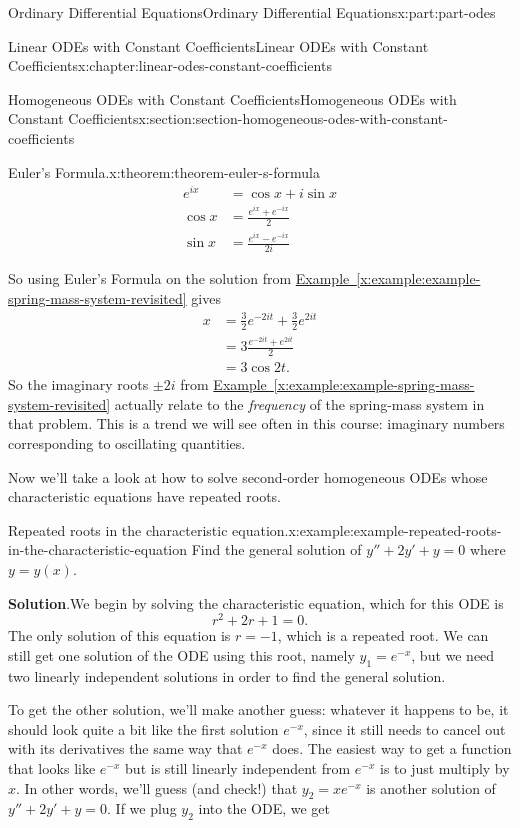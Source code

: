 \documentclass[twoside,10pt,]{book}
\newcommand{\blocktitlefont}{\relax}
\newcommand{\xreffont}{\relax}
\numberwithin{equation}{part}
\newcommand{\amp}{&}
\begin{document}
\begin{partptx}{Ordinary Differential Equations}{}{Ordinary Differential Equations}{}{}{x:part:part-odes}
\begin{chapterptx}{Linear ODEs with Constant Coefficients}{}{Linear ODEs with Constant Coefficients}{}{}{x:chapter:linear-odes-constant-coefficients}
\begin{sectionptx}{Homogeneous ODEs with Constant Coefficients}{}{Homogeneous ODEs with Constant Coefficients}{}{}{x:section:section-homogeneous-odes-with-constant-coefficients}
\begin{theorem}{Euler's Formula.}{}{x:theorem:theorem-euler-s-formula}
\begin{align*}
e^{ix} \amp = \cos x + i\sin x \\
\cos x \amp = \frac{e^{ix}+e^{-ix}}{2} \\
\sin x \amp = \frac{e^{ix} - e^{-ix}}{2i} 
\end{align*}
%
\end{theorem}
So using Euler's Formula on the solution from \hyperref[x:example:example-spring-mass-system-revisited]{Example~{\xreffont\ref{x:example:example-spring-mass-system-revisited}}} gives%
\begin{align*}
x \amp = \frac{3}{2}e^{-2it} + \frac{3}{2} e^{2it} \\
\amp = 3\frac{e^{-2it} + e^{2it}}{2} \\
\amp = 3\cos2t. 
\end{align*}
So the imaginary roots \(\pm2i\) from \hyperref[x:example:example-spring-mass-system-revisited]{Example~{\xreffont\ref{x:example:example-spring-mass-system-revisited}}} actually relate to the \emph{frequency} of the spring-mass system in that problem. This is a trend we will see often in this course: imaginary numbers corresponding to oscillating quantities.%
\par
Now we'll take a look at how to solve second-order homogeneous ODEs whose characteristic equations have repeated roots.%
\begin{example}{Repeated roots in the characteristic equation.}{x:example:example-repeated-roots-in-the-characteristic-equation}%
Find the general solution of \(y'' + 2y' + y = 0\) where \(y = y(x)\).%
\par\smallskip%
\noindent\textbf{\blocktitlefont Solution}.\hypertarget{g:solution:idp105548815517856}{}\quad{}We begin by solving the characteristic equation, which for this ODE is%
\begin{equation*}
r^{2} + 2r + 1 = 0.
\end{equation*}
The only solution of this equation is \(r=-1\), which is a repeated root. We can still get one solution of the ODE using this root, namely \(y_{1} = e^{-x}\), but we need two linearly independent solutions in order to find the general solution.%
\par
To get the other solution, we'll make another guess: whatever it happens to be, it should look quite a bit like the first solution \(e^{-x}\), since it still needs to cancel out with its derivatives the same way that \(e^{-x}\) does. The easiest way to get a function that looks like \(e^{-x}\) but is still linearly independent from \(e^{-x}\) is to just multiply by \(x\). In other words, we'll guess (and check!) that \(y_{2} = xe^{-x}\) is another solution of \(y''+2y'+y = 0\). If we plug \(y_{2}\) into the ODE, we get%

\end{example}
\end{sectionptx}
\end{chapterptx}
\end{partptx}
\end{document}
